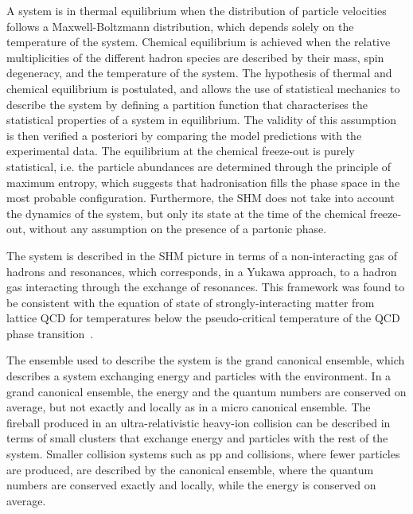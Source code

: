A system is in thermal equilibrium when the distribution of particle velocities follows a Maxwell-Boltzmann distribution, which depends solely on the temperature of the system. Chemical equilibrium is achieved when the relative multiplicities of the different hadron species are described by their mass, spin degeneracy, and the temperature of the system. The hypothesis of thermal and chemical equilibrium is postulated, and allows the use of statistical mechanics to describe the system by defining a partition function that characterises the statistical properties of a system in equilibrium. The validity of this assumption is then verified a posteriori by comparing the model predictions with the experimental data. The equilibrium at the chemical freeze-out is purely statistical, i.e. the particle abundances are determined through the principle of maximum entropy, which suggests that hadronisation fills the phase space in the most probable configuration. Furthermore, the SHM does not take into account the dynamics of the system, but only its state at the time of the chemical freeze-out, without any assumption on the presence of a partonic phase. 

The system is described in the SHM picture in terms of a non-interacting gas of hadrons and resonances, which corresponds, in a Yukawa approach, to a hadron gas interacting through the exchange of resonances. This framework was found to be consistent with the equation of state of strongly-interacting matter from lattice QCD for temperatures below the pseudo-critical temperature of the QCD phase transition~\cite{HotQCD:2014kol}. 

The ensemble used to describe the system is the grand canonical ensemble, which describes a system exchanging energy and particles with the environment. In a grand canonical ensemble, the energy and the quantum numbers are conserved on average, but not exactly and locally as in a micro canonical ensemble. The fireball produced in an ultra-relativistic heavy-ion collision can be described in terms of small clusters that exchange energy and particles with the rest of the system. Smaller collision systems such as pp and \ee collisions, where fewer particles are produced, are described by the canonical ensemble, where the quantum numbers are conserved exactly and locally, while the energy is conserved on average.


